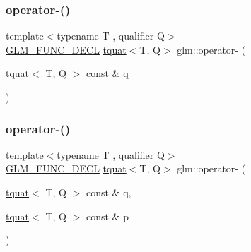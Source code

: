 \subsubsection{\texorpdfstring{operator-\/()}{operator-()}\hspace{0.1cm}{\footnotesize\ttfamily [1/2]}}
{\footnotesize\ttfamily template$<$typename T , qualifier Q$>$ \\
\mbox{\hyperlink{setup_8hpp_ab2d052de21a70539923e9bcbf6e83a51}{G\+L\+M\+\_\+\+F\+U\+N\+C\+\_\+\+D\+E\+CL}} \mbox{\hyperlink{structglm_1_1tquat}{tquat}}$<$T, Q$>$ glm\+::operator-\/ (\begin{DoxyParamCaption}\item[{\mbox{\hyperlink{structglm_1_1tquat}{tquat}}$<$ T, Q $>$ const \&}]{q }\end{DoxyParamCaption})}

\mbox{\label{group__gtc__quaternion_ga004ef8d57d8c50ec4356e2b8a43e93af}} 
\subsubsection{\texorpdfstring{operator-\/()}{operator-()}\hspace{0.1cm}{\footnotesize\ttfamily [2/2]}}
{\footnotesize\ttfamily template$<$typename T , qualifier Q$>$ \\
\mbox{\hyperlink{setup_8hpp_ab2d052de21a70539923e9bcbf6e83a51}{G\+L\+M\+\_\+\+F\+U\+N\+C\+\_\+\+D\+E\+CL}} \mbox{\hyperlink{structglm_1_1tquat}{tquat}}$<$T, Q$>$ glm\+::operator-\/ (\begin{DoxyParamCaption}\item[{\mbox{\hyperlink{structglm_1_1tquat}{tquat}}$<$ T, Q $>$ const \&}]{q,  }\item[{\mbox{\hyperlink{structglm_1_1tquat}{tquat}}$<$ T, Q $>$ const \&}]{p }\end{DoxyParamCaption})}

\mbox{\label{group__gtc__quaternion_ga077354a34d5111b6c904db7bf331a31f}} 
